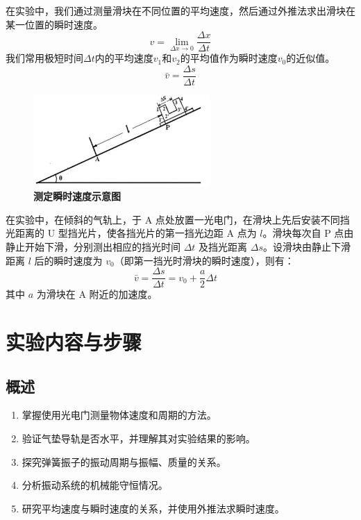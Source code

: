 \documentclass[UTF8]{article}
\theoremstyle{MyLineTheoremStyle} %
\theoremstyle{MyBlockTheoremStyle} %
\theoremstyle{MySubsubsectionStyle} %
\begin{document}
在实验中，我们通过测量滑块在不同位置的平均速度，然后通过外推法求出滑块在某一位置的瞬时速度。\\
\begin{equation}
    v=\lim_{\Delta x\rightarrow 0}\frac{\Delta x}{\Delta t}
\end{equation}
我们常用极短时间$\Delta t$内的平均速度$v_{1}$和$v_{2}$的平均值作为瞬时速度$v_{0}$的近似值。\\
\begin{equation}
    \bar{v}=\frac{\Delta s}{\Delta t}
\end{equation}
\begin{figure}[H]
    \centering
    \includegraphics[width=0.6\textwidth]{2.png}
    \caption{\bfseries 测定瞬时速度示意图}
    \label{fig2}
\end{figure}
在实验中，在倾斜的气轨上，于 A 点处放置一光电门，在滑块上先后安装不同挡光距离的 U 型挡光片，使各挡光片的第一挡光边距 A 点为 $l$。滑块每次自 P 点由静止开始下滑，分别测出相应的挡光时间 $\Delta t$ 及挡光距离 $\Delta s$。设滑块由静止下滑距离 $l$ 后的瞬时速度为 $v_0$（即第一挡光时滑块的瞬时速度），则有：
\begin{equation}
\bar{v} = \frac{\Delta s}{\Delta t} = v_0 + \frac{a}{2} \Delta t \quad 
\end{equation}
其中 $a$ 为滑块在 A 附近的加速度。













\section{实验内容与步骤}
\subsection{概述}
\begin{enumerate}
    \item 掌握使用光电门测量物体速度和周期的方法。
    \item 验证气垫导轨是否水平，并理解其对实验结果的影响。
    \item 探究弹簧振子的振动周期与振幅、质量的关系。
    \item 分析振动系统的机械能守恒情况。
    \item 研究平均速度与瞬时速度的关系，并使用外推法求瞬时速度。
\end{enumerate}
\end{document}
